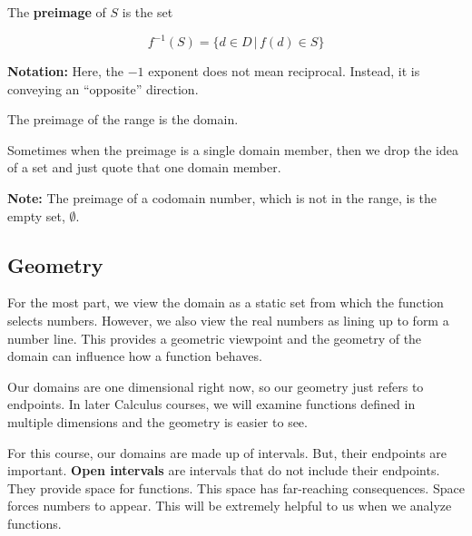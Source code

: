 \documentclass{ximera}
\begin{document}
The \textbf{preimage} of $S$ is the set

\[  f^{-1}(S) = \{ d \in D \, | \, f(d) \in S  \}    \]

\textbf{Notation:}  Here, the $-1$ exponent does not mean reciprocal.  Instead, it is conveying an ``opposite'' direction.


The preimage of the range is the domain. 


Sometimes when the preimage is a single domain member, then we drop the idea of a set and just quote that one domain member. 


\textbf{Note:} The preimage of a codomain number, which is not in the range, is the empty set, $\emptyset$. 





































\subsection*{Geometry}

For the most part, we view the domain as a static set from which the function selects numbers. However, we also view the real numbers as lining up to form a number line. This provides a geometric viewpoint and the geometry of the domain can influence how a function behaves.


Our domains are one dimensional right now, so our geometry just refers to endpoints.  In later Calculus courses, we will examine functions defined in multiple dimensions and the geometry is easier to see.

For this course, our domains are made up of intervals.  But, their endpoints are important. \textbf{Open intervals} are intervals that do not include their endpoints.  They provide space for functions.  This space has far-reaching consequences. Space forces numbers to appear. This will be extremely helpful to us when we analyze functions. 
\end{document}
